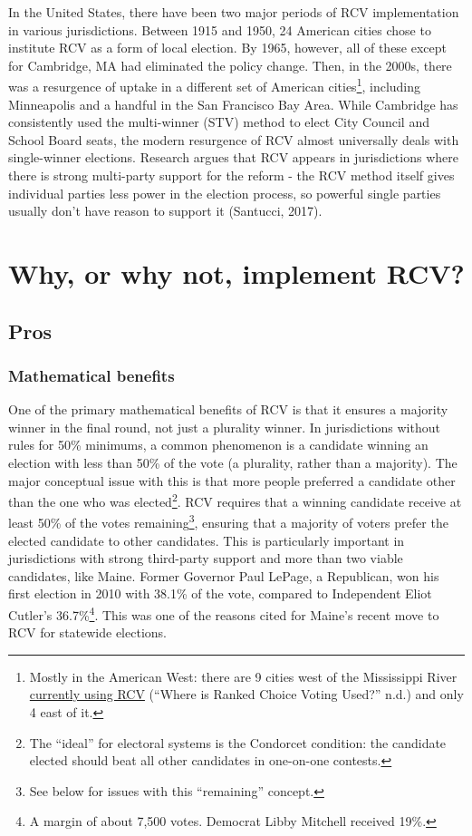 \documentclass[12pt,twoside]{reedthesis}
\begin{document}
In the United States, there have been two major periods of RCV implementation in various jurisdictions. Between 1915 and 1950, 24 American cities chose to institute RCV as a form of local election. By 1965, however, all of these except for Cambridge, MA had eliminated the policy change. Then, in the 2000s, there was a resurgence of uptake in a different set of American cities\footnote{Mostly in the American West: there are 9 cities west of the Mississippi River \href{https://www.fairvote.org/where_is_ranked_choice_voting_used}{currently using RCV} (``Where is Ranked Choice Voting Used?'' n.d.) and only 4 east of it.}, including Minneapolis and a handful in the San Francisco Bay Area. While Cambridge has consistently used the multi-winner (STV) method to elect City Council and School Board seats, the modern resurgence of RCV almost universally deals with single-winner elections. Research argues that RCV appears in jurisdictions where there is strong multi-party support for the reform - the RCV method itself gives individual parties less power in the election process, so powerful single parties usually don't have reason to support it (Santucci, 2017).

\hypertarget{rcv-args}{%
\section{Why, or why not, implement RCV?}\label{rcv-args}}

\hypertarget{pros}{%
\subsection{Pros}\label{pros}}

\hypertarget{mathematical-benefits}{%
\subsubsection{Mathematical benefits}\label{mathematical-benefits}}

One of the primary mathematical benefits of RCV is that it ensures a majority winner in the final round, not just a plurality winner. In jurisdictions without rules for 50\% minimums, a common phenomenon is a candidate winning an election with less than 50\% of the vote (a plurality, rather than a majority). The major conceptual issue with this is that more people preferred a candidate other than the one who was elected\footnote{The ``ideal'' for electoral systems is the Condorcet condition: the candidate elected should beat all other candidates in one-on-one contests.}. RCV requires that a winning candidate receive at least 50\% of the votes remaining\footnote{See below for issues with this ``remaining'' concept.}, ensuring that a majority of voters prefer the elected candidate to other candidates. This is particularly important in jurisdictions with strong third-party support and more than two viable candidates, like Maine. Former Governor Paul LePage, a Republican, won his first election in 2010 with 38.1\% of the vote, compared to Independent Eliot Cutler's 36.7\%\footnote{A margin of about 7,500 votes. Democrat Libby Mitchell received 19\%.}. This was one of the reasons cited for Maine's recent move to RCV for statewide elections.
\end{document}
